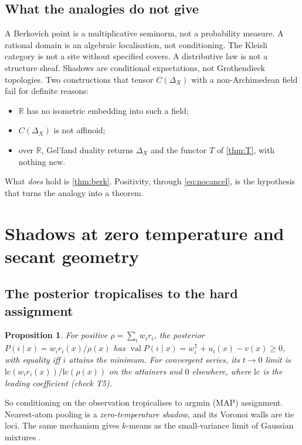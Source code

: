 \documentclass[11pt]{article}
\newtheorem{proposition}[theorem]{Proposition}
\theoremstyle{definition}
\newcommand{\T}{\mathbb T}
\newcommand{\R}{\mathbb R}
\newcommand{\val}{\operatorname{val}}
\begin{document}
\subsection{What the analogies do not give}
A Berkovich point is a multiplicative seminorm, not a probability measure. A rational domain is an algebraic localisation, not
conditioning. The Kleisli category is not a site without specified covers. A distributive law is not a structure sheaf. Shadows are
conditional expectations, not Grothendieck topologies. Two constructions that tensor $C(\Delta_X)$ with a non-Archimedean field fail
for definite reasons:
\begin{itemize}
\item $\R$ has no isometric embedding into such a field;
\item $C(\Delta_X)$ is not affinoid;
\item over $\R$, Gel'fand duality returns $\Delta_X$ and the functor $T$ of \cref{thm:T}, with nothing new.
\end{itemize}
What \emph{does} hold is \cref{thm:berk}. Positivity, through \eqref{eq:nocancel}, is the hypothesis that turns the analogy into a
theorem.

\section{Shadows at zero temperature and secant geometry}\label{sec:secant}

\subsection{The posterior tropicalises to the hard assignment}
\begin{proposition}\label{prop:posterior}
For positive $\rho=\sum_iw_ir_i$, the posterior $P(i\mid x)=w_ir_i(x)/\rho(x)$ has $\val P(i\mid x)=w_i^\T+u_i(x)-v(x)\ge0$, with
equality iff $i$ attains the minimum. For convergent series, its $t\to0$ limit is $\mathrm{lc}(w_ir_i(x))/\mathrm{lc}(\rho(x))$ on the
attainers and $0$ elsewhere, where $\mathrm{lc}$ is the leading coefficient (check T5).
\end{proposition}

So conditioning on the observation tropicalises to argmin (MAP) assignment. Nearest-atom pooling is a \emph{zero-temperature shadow},
and its Voronoi walls are tie loci. The same mechanism gives $k$-means as the small-variance limit of Gaussian mixtures
\cite{KulisJordan2012}.
\end{document}
